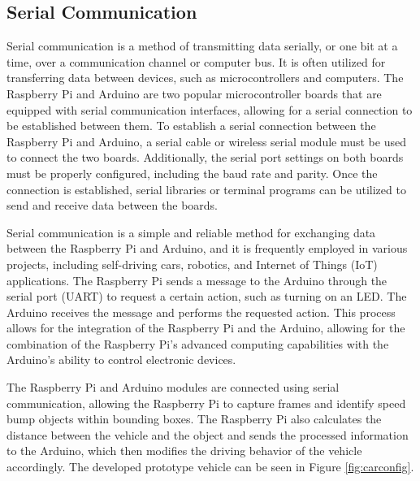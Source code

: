 \subsection{Serial Communication}
Serial communication is a method of transmitting data serially, or one bit at a time, over a communication channel or computer bus. It is often utilized for transferring data between devices, such as microcontrollers and computers. The Raspberry Pi and Arduino are two popular microcontroller boards that are equipped with serial communication interfaces, allowing for a serial connection to be established between them. To establish a serial connection between the Raspberry Pi and Arduino, a serial cable or wireless serial module must be used to connect the two boards. Additionally, the serial port settings on both boards must be properly configured, including the baud rate and parity. Once the connection is established, serial libraries or terminal programs can be utilized to send and receive data between the boards.

\noindent
Serial communication is a simple and reliable method for exchanging data between the Raspberry Pi and Arduino, and it is frequently employed in various projects, including self-driving cars, robotics, and Internet of Things (IoT) applications. The Raspberry Pi sends a message to the Arduino through the serial port (UART) to request a certain action, such as turning on an LED. The Arduino receives the message and performs the requested action. This process allows for the integration of the Raspberry Pi and the Arduino, allowing for the combination of the Raspberry Pi's advanced computing capabilities with the Arduino's ability to control electronic devices.

\noindent
The Raspberry Pi and Arduino modules are connected using serial communication, allowing the Raspberry Pi to capture frames and identify speed bump objects within bounding boxes. The Raspberry Pi also calculates the distance between the vehicle and the object and sends the processed information to the Arduino, which then modifies the driving behavior of the vehicle accordingly. The developed prototype vehicle can be seen in Figure \ref{fig:carconfig}. 

